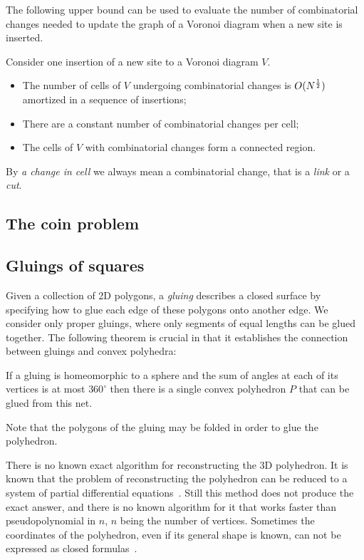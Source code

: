 \documentclass[a4paper,11pt]{article}
\begin{document}
The following upper bound can be used to evaluate the number of combinatorial changes needed to update the graph of a Voronoi diagram when a new site is inserted.

\begin{theorem} \label{thm:amorCost} 
	Consider one insertion of a new site to a Voronoi diagram $V$\!\!.
\begin{itemize}
	\item The number of cells of $V$\!\! undergoing combinatorial changes is $O(N^\frac{1}{2} )$ amortized in a sequence of insertions;
	\item There are a constant number of combinatorial changes per cell;
	\item The cells of $V$\!\! with combinatorial changes form a connected region.
\end{itemize}
\end{theorem}

By {\itshape a change in cell} we always mean a combinatorial change, that is a {\itshape link} or a {\itshape cut}.

\subsection{The coin problem}



\subsection{Gluings of squares}

Given a collection of 2D polygons, a \emph{gluing} describes a closed surface by specifying how to glue each edge of these polygons onto another edge. We consider only proper gluings, where only segments of equal lengths can be glued together. The following theorem is crucial in that it establishes the connection between gluings and convex polyhedra:

\begin{theorem}
\label{thm:alexandrov}
	If a gluing is homeomorphic to a sphere and the sum of angles at each of its vertices is at most $360^\circ$ then there is a single convex polyhedron $P$ that can be glued from this net.
\end{theorem}

Note that the polygons of the gluing may be folded in order to glue the polyhedron.

There is no known exact algorithm for reconstructing the 3D polyhedron.
It is known that the problem of reconstructing the polyhedron can be
reduced to a system of partial differential equations~\cite{kpd09-approx}.
Still this method does not produce the exact answer, and there is no
known algorithm for it that works faster than pseudopolynomial in $n$,
$n$ being the number of vertices. Sometimes the coordinates of the
polyhedron, even if its general shape is known, can not be
expressed as closed formulas~\cite{bannister2014galois}.
\end{document}
